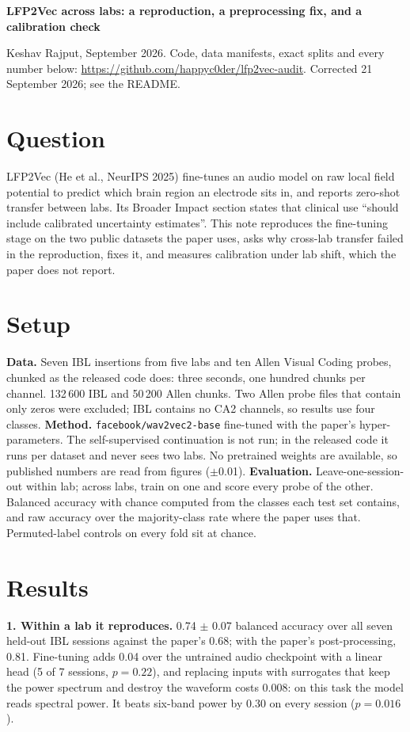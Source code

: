 \documentclass[10pt,a4paper]{article}
\begin{document}
{\large\bfseries LFP2Vec across labs: a reproduction, a preprocessing fix, and a calibration check}

\vspace{2pt}
{\small Keshav Rajput, September 2026. Code, data manifests, exact splits and every number below:
\url{https://github.com/happyc0der/lfp2vec-audit}. Corrected 21 September 2026; see the README.}

\section{Question}
LFP2Vec (He et al., NeurIPS 2025) fine-tunes an audio model on raw local field potential to
predict which brain region an electrode sits in, and reports zero-shot transfer between labs. Its
Broader Impact section states that clinical use ``should include calibrated uncertainty
estimates''. This note reproduces the fine-tuning stage on the two public datasets the paper uses,
asks why cross-lab transfer failed in the reproduction, fixes it, and measures calibration under
lab shift, which the paper does not report.

\section{Setup}
\textbf{Data.} Seven IBL insertions from five labs and ten Allen Visual Coding probes, chunked as
the released code does: three seconds, one hundred chunks per channel. 132\,600 IBL and 50\,200
Allen chunks. Two Allen probe files that contain only zeros were excluded; IBL contains no CA2
channels, so results use four classes.
\textbf{Method.} \texttt{facebook/wav2vec2-base} fine-tuned with the paper's hyper-parameters. The
self-supervised continuation is not run; in the released code it runs per dataset and never sees
two labs. No pretrained weights are available, so published numbers are read from figures
($\pm$0.01).
\textbf{Evaluation.} Leave-one-session-out within lab; across labs, train on one and score every
probe of the other. Balanced accuracy with chance computed from the classes each test set
contains, and raw accuracy over the majority-class rate where the paper uses that. Permuted-label
controls on every fold sit at chance.

\section{Results}
\textbf{1. Within a lab it reproduces.} 0.74 $\pm$ 0.07 balanced accuracy over all seven
held-out IBL sessions against the paper's 0.68; with the paper's post-processing, 0.81. Fine-tuning
adds 0.04 over the untrained audio checkpoint with a linear head (5 of 7 sessions, $p=0.22$), and
replacing inputs with surrogates that keep the power spectrum and destroy the waveform costs
0.008: on this task the model reads spectral power. It beats six-band power by 0.30 on every
session ($p=0.016$).
\end{document}

